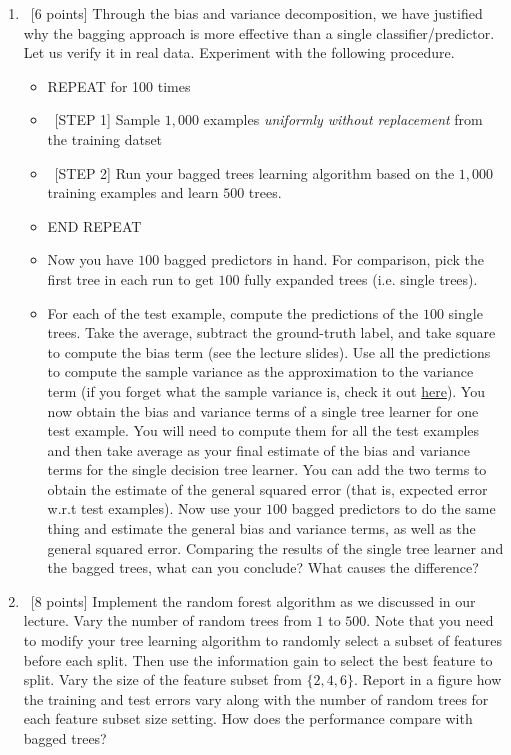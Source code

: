 \documentclass[12pt, fullpage,letterpaper]{article}
\begin{document}
\begin{enumerate}
\begin{enumerate}
	\item~[6 points] Through the bias and variance decomposition, we have justified why the bagging approach is more effective than a single classifier/predictor. Let us verify it in real data. Experiment with the following procedure.
	\begin{itemize}
		\item REPEAT for 100 times
		\item ~[STEP 1] Sample $1,000$ examples \textit{uniformly without replacement} from the training datset
		\item ~[STEP 2] Run your bagged trees learning algorithm based on the $1,000$ training examples and learn $500$ trees.
		\item END REPEAT 
		\item Now you have $100$ bagged predictors in hand. For comparison, pick the first tree in each run to get $100$ fully expanded trees (i.e. single trees). 
		\item 	For each of the test example, compute the predictions of the $100$ single trees. Take the average, subtract the ground-truth label, and take square to compute the bias term (see the lecture slides). Use all the predictions to compute the sample variance  as the approximation to the variance term (if you forget what the sample variance is, check it out 
		\href{http://www.randomservices.org/random/sample/Variance.html}{here}). You now obtain the bias and variance terms of a single tree learner for one test example. You will need to compute them for all the test examples and then take average as your final estimate of the bias and variance terms for the single decision tree learner. You can add the two terms to obtain the estimate of the general squared error (that is, expected error w.r.t test examples). Now use your $100$ bagged predictors to do the same thing and estimate the general bias and variance terms, as well as the general squared error.  Comparing the results of the single tree learner and the bagged trees, what can you conclude?  What causes the difference?  
	\end{itemize}
	 
	\item~[8 points] Implement the random forest algorithm as we discussed in our lecture. Vary the number of random trees from $1$ to $500$. Note that you need to modify your tree learning algorithm to randomly select a subset of features before each split. Then use the information gain to select the best feature to split.  Vary the size of the feature subset from $\{2, 4, 6\}$.  Report in a figure how the training and test errors vary along with the number of random trees for each feature subset size setting. How does the performance compare with bagged trees? 
	

\end{enumerate}
\end{enumerate}
\end{document}
